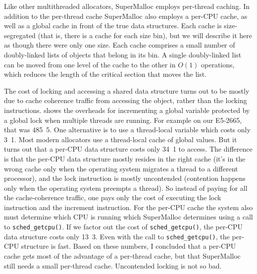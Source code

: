 \documentclass[natbib,sort&compress,10pt]{sigplanconf}
\newcommand{\code}[1]{\texttt{#1}}
\begin{document}

Like other multithreaded allocators, SuperMalloc employs per-thread
caching.  In addition to the per-thread cache SuperMalloc also employs
a per-CPU cache, as well as a global cache in front of the true data
structures.  Each cache is size-segregated (that is, there is a cache
for each size bin), but we will describe it here as though there were
only one size.  Each cache comprises a small number of doubly-linked
lists of objects that belong in its bin.  A single doubly-linked list
can be moved from one level of the cache to the other in $O(1)$
operations, which reduces the length of the critical section that
moves the list.

The cost of locking and accessing a shared data structure turns out to
be mostly due to cache coherence traffic from accessing the object,
rather than the locking instructions.   shows the
overheads for incrementing a global variable protected by a global
lock when multiple threads are running.  For example on our E5-2665,
that was \unit{485.5}\nano\second.  One alternative is to use a
thread-local variable which costs only \unit{3.1}\nano\second.  Most
modern allocators use a thread-local cache of global values.  But it
turns out that a per-CPU data structure costs only
\unit{34.1}\nano\second{} to access.  The difference is that the
per-CPU data structure mostly resides in the right cache (it's in the
wrong cache only when the operating system migrates a thread to a
different processor), and the lock instruction is mostly uncontended
(contention happens only when the operating system preempts a thread).
So instead of paying for all the cache-coherence traffic, one pays
only the cost of executing the lock instruction and the increment
instruction.  For the per-CPU cache the system also must determine
which CPU is running which SuperMalloc determines using a call to
\code{sched\_getcpu()}.  If we factor out the cost of
\code{sched\_getcpu()}, the per-CPU data structure costs only
\unit{13.3}\nano\second.  Even with the call to \code{sched\_getcpu()},
the per-CPU structure is fast. Based on these numbers, I concluded
that a per-CPU cache gets most of the advantage of a per-thread cache,
but that SuperMalloc still needs a small per-thread cache.
Uncontended locking is not so bad.
\end{document}
